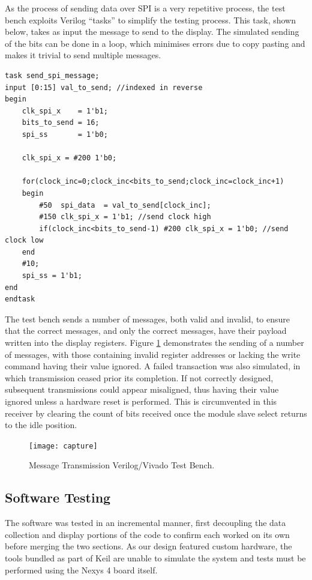 \documentclass[11pt,british]{report}
\begin{document}
As the process of sending data over SPI is a very repetitive process, the test bench exploits Verilog ``tasks'' to simplify the testing process. This task, shown below, takes as input the message to send to the display. The simulated sending of the bits can be done in a loop, which minimises errors due to copy pasting and makes it trivial to send multiple messages.
\begin{lstlisting}[style={verilog-style}]
task send_spi_message;
input [0:15] val_to_send; //indexed in reverse
begin
    clk_spi_x    = 1'b1;
    bits_to_send = 16;
    spi_ss       = 1'b0;
    
    clk_spi_x = #200 1'b0;
    
    for(clock_inc=0;clock_inc<bits_to_send;clock_inc=clock_inc+1)
    begin
        #50  spi_data  = val_to_send[clock_inc];
        #150 clk_spi_x = 1'b1; //send clock high
        if(clock_inc<bits_to_send-1) #200 clk_spi_x = 1'b0; //send clock low
    end
    #10;
    spi_ss = 1'b1;        
end
endtask
\end{lstlisting}
The test bench sends a number of messages, both valid and invalid, to ensure that the correct messages, and only the correct messages, have their payload written into the display registers. Figure \ref{fig:TB} demonstrates the sending of a number of messages, with those containing invalid register addresses or lacking the write command having their value ignored. A failed transaction was also simulated, in which transmission ceased prior its completion. If not correctly designed, subsequent transmissions could appear misaligned, thus having their value ignored unless a hardware reset is performed. This is circumvented in this receiver by clearing the count of bits received once the module slave select returns to the idle position. 
\begin{figure}[h]
	\centering
	\texttt{[image: capture]}
	\caption{Message Transmission Verilog/Vivado Test Bench.}
	\label{fig:TB}
\end{figure}

\subsection*{Software Testing}
The software was tested in an incremental manner, first decoupling the data collection and display portions of the code to confirm each worked on its own before merging the two sections. As our design featured custom hardware, the tools bundled as part of Keil are unable to simulate the system and tests must be performed using the Nexys 4 board itself.
\end{document}
